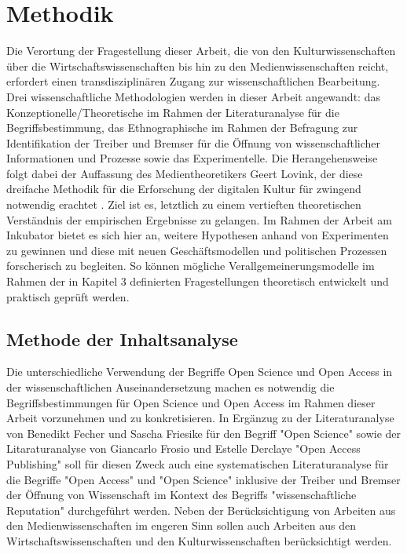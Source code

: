 \chapter{Methodik}
Die Verortung der Fragestellung dieser Arbeit, die von den Kulturwissenschaften über die Wirtschaftswissenschaften bis hin zu den Medienwissenschaften reicht, erfordert einen transdisziplinären Zugang zur wissenschaftlichen Bearbeitung. 
Drei wissenschaftliche Methodologien werden in dieser Arbeit angewandt: das Konzeptionelle/Theoretische im Rahmen der Literaturanalyse für die Begriffsbestimmung, das Ethnographische im Rahmen der Befragung zur Identifikation der Treiber und Bremser für die Öffnung von wissenschaftlicher Informationen und Prozesse sowie das Experimentelle. 
Die Herangehensweise folgt dabei der Auffassung des Medientheoretikers Geert Lovink, der diese dreifache Methodik für die Erforschung der digitalen Kultur für zwingend notwendig erachtet . 
Ziel ist es, letztlich zu einem vertieften theoretischen Verständnis der empirischen Ergebnisse zu gelangen. Im Rahmen der Arbeit am Inkubator bietet es sich hier an, weitere Hypothesen anhand von Experimenten zu gewinnen und diese mit neuen Geschäftsmodellen und politischen Prozessen forscherisch zu begleiten. So können mögliche Verallgemeinerungsmodelle im Rahmen der in Kapitel 3 definierten Fragestellungen theoretisch entwickelt und praktisch geprüft werden.
\section{Methode der Inhaltsanalyse}
Die unterschiedliche Verwendung der Begriffe Open Science und Open Access in der wissenschaftlichen Auseinandersetzung machen es notwendig die Begriffsbestimmungen für Open Science und Open Access im Rahmen dieser Arbeit vorzunehmen und zu konkretisieren. In Ergänzug zu der Literaturanalyse von Benedikt Fecher und Sascha Friesike für den Begriff "Open Science"\cite{cite:9} sowie der Litaraturanalyse von Giancarlo Frosio und Estelle Derclaye "Open Access Publishing" \cite{CREATe_2014} soll für diesen Zweck auch eine systematischen Literaturanalyse für die Begriffe "Open Access" und "Open Science" inklusive der Treiber und Bremser der Öffnung von Wissenschaft im Kontext des Begriffs "wissenschaftliche Reputation" durchgeführt werden. Neben der Berücksichtigung von Arbeiten aus den Medienwissenschaften im engeren Sinn sollen auch Arbeiten aus den Wirtschaftswissenschaften und den Kulturwissenschaften berücksichtigt werden.
